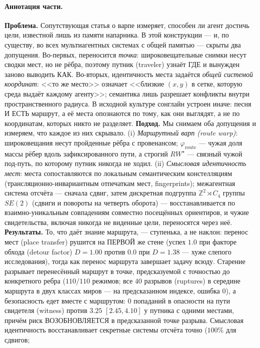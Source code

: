 \documentclass{article}
\newcommand{\rwstar}{RW^{\star}}
\newcommand{\phiroute}{\varphi_{\mathrm{route}}}
\begin{document}
\paragraph{Аннотация части.} \textbf{Проблема.} Сопутствующая статья о варпе измеряет, способен ли
агент достичь цели, известной лишь из памяти напарника. В этой
конструкции --- и, по существу, во всех мультиагентных системах с общей
памятью --- скрыты два допущения. Во-первых, переносится \emph{точка}:
широковещательные снимки несут сводки мест, но не рёбра, поэтому путник
(traveler) узнаёт ГДЕ и вынужден заново выводить КАК. Во-вторых,
идентичность места задаётся \emph{общей системой координат}: <<то же
место>> означает <<близкие $(x,y)$ в сетке, которую среда выдаёт каждому
агенту>>; семантика лишь разрешает конфликты внутри пространственного
радиуса. В исходной культуре сонглайн устроен иначе: песня И ЕСТЬ
маршрут, а её места опознаются по тому, как они выглядят, а не по
координатам, которых никто не разделяет.
\textbf{Подход.} Мы снимаем оба допущения и измеряем, что каждое из них
скрывало. (i) \emph{Маршрутный варп (route warp)}: широковещания несут
пройденные рёбра с провенансом; $\phiroute$ --- чужая доля массы рёбер
вдоль зафиксированного пути, а строгий $\rwstar$ --- связный чужой
под-путь, по которому путник никогда не ходил. (ii) \emph{Смысловая
идентичность мест}: места сопоставляются по локальным семантическим
констелляциям (трансляционно-инвариантным отпечаткам мест,
fingerprints); межагентная система отсчёта --- сначала сдвиг, затем
дискретная подгруппа $\mathbb{Z}^2\rtimes C_4$ группы $SE(2)$ (сдвиги и повороты на четверть оборота) --- восстанавливается по взаимно-уникальным
совпадениям совместно посещённых ориентиров, и чужие свидетельства,
включая никогда не виденные цели, переносятся через неё.
\textbf{Результаты.} То, что даёт знание маршрута, --- ступенька, а не
наклон: перенос мест (place transfer) рушится на ПЕРВОЙ же стене (успех
$1.0$ при факторе обхода (detour factor) $D{=}1.00$ против $0.0$ при
$D{=}1.38$ --- хуже слепого исследования), тогда как перенос маршрута
завершает задачу всюду. Старение разрывает перенесённый маршрут в точке,
предсказуемой с точностью до конкретного ребра ($110/110$ режимов; все
$40$ разрывов (ruptures) в середине маршрута в двух классах миров --- на
предсказанном индексе, ошибка $0$), а безопасность едет вместе с
маршрутом: $0$ попаданий в опасности на пути свидетеля (witness) против
$3.25$ $[2.45,4.10]$ у путника с одними местами, причём риск
ВОЗОБНОВЛЯЕТСЯ в предсказанной точке разрыва. Смысловая идентичность
восстанавливает секретные системы отсчёта точно ($100\%$ для сдвигов;
\end{document}

